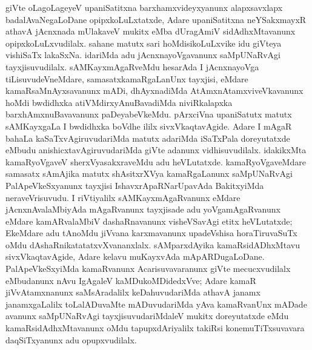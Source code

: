 giVte oLagoLageyeV upaniSatitxna barxhamxvideyxyanunx alapxsavxlapx badalAvaNe\-gaLoDane opipxkoLuLxtatxde, Adare upaniSatitxna neYSakxmayxR athavA jAcnxnada mUlakaveV mukitx eMba dUragAmiV sidAdhxMtavanunx opipxkoLuLxvudilalx. sahane matutx sari hoMdisikoLuLxvike idu giVteya vishiSaTx lakaSxNa. idariMda adu jAcnxnayoVgavanunx saMpUNaRvAgi tayxji\-suvudilalx. sAMKayxmAgaRveMdu hesarAda I jAcnxnayoVga tiLisuvudeVneMdare, samasatx\break kamaRgaLanUnx tayxjisi, eMdare kamaRsaMnAyxsavanunx mADi, dhAyxnadiMda AtAmxnAtamx\break\-viveVkavanunx hoMdi bwdidhxka atiVMdirxyAnuBavadiMda niviRkalapxka barxhAmxnuBava\-vanunx paDeyabeVkeMdu. pArxciVna upaniSatutx matutx sAMKayxgaLa I bwdidhxka boVdhe ililx sivxVkaqtavAgide. Adare I mAgaR bahaLa kaSaTxvAgiruvudariMda matutx adariMda iSaTx\-Pala doreyutatxde eMbudu anishicxtavAgiruvudariMda giVte adanunx vidhisuvudilalx. idakikxMta kamaRyoVgaveV sherxVyasakxraveMdu adu heVLutatxde. kamaRyoVgaveMdare samasatx sAmAjika matutx shAsitxrXVya kamaRgaLanunx saMpUNaRvAgi PalApeVkeSxyanunx tayxjisi IshavxrApaRNarUpavAda BakitxyiMda neraveVrisuvudu. I riVtiyalilx sAMKayx\-mAgaRvanunx eMdare jAcnxnAvalaMbiyAda mAgaRvanunx tayxjisade adu yoVga\-mAgaR\-vanunx eMdare kamARvalaMbiV dashaRnavanunx visheVSavAgi etitx heVLutatxde; EkeMdare adu tAnoMdu jiVvana karxmavanunx upadeVshisa horaTiruvaSuTx oMdu dAshaRnikatatatxvXvananxlalx. sAMparxdAyika kamaRsidADhxMtavu sivxVkaqtavAgide, Adare kelavu muKayxvAda mApARDugaLoDane. PalApeVkeSxyiMda kamaRvanunx Acarisuvavaranunx giVte mecucxvu\-dilalx eMbudanunx nAvu IgAgaleV kaMDukoMDidedxVve; Adare kamaR jiVvAtamxnanunx saMsAradalilx keDahuvudariMda athavA janamx janamxgaLalilx toLalADuvaMte mADuvuda\-riMda yAva kamaRvanUnx mADade avanunx saMpUNaRvAgi tayxjisuvudariMdaleV \hbox{mukitx} doreyutatxde eMdu kamaRsidAdhxMtavanunx oMdu tapupxdAriyalilx takiRsi kone\-muTiTxsu\-vavara daqSiTxyanunx adu opupxvudilalx.

